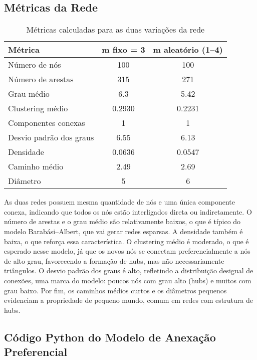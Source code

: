 \documentclass{article}
\begin{document}
\subsection*{Métricas da Rede}

\begin{table}[h]
\centering
\begin{tabular}{|l|c|c|}
\hline
\textbf{Métrica} & \textbf{m fixo = 3} & \textbf{m aleatório (1–4)} \\
\hline
Número de nós & 100 & 100 \\
Número de arestas & 315 & 271 \\
Grau médio & 6.3 & 5.42 \\
Clustering médio & 0.2930 & 0.2231 \\
Componentes conexas & 1 & 1 \\
Desvio padrão dos graus & 6.55 & 6.13 \\
Densidade & 0.0636 & 0.0547 \\
Caminho médio & 2.49 & 2.69 \\
Diâmetro & 5 & 6 \\
\hline
\end{tabular}
\caption{Métricas calculadas para as duas variações da rede}
\label{tab:metricas_rede}
\end{table}

As duas redes possuem mesma quantidade de nós e uma única componente conexa, indicando que todos os nós estão interligados direta ou indiretamente. O número de arestas e o grau médio são relativamente baixos, o que é típico do modelo Barabási–Albert, que vai gerar redes esparsas. A densidade também é baixa, o que reforça essa característica. O clustering médio é moderado, o que é esperado nesse modelo, já que os novos nós se conectam preferencialmente a nós de alto grau, favorecendo a formação de hubs, mas não necessariamente triângulos. O desvio padrão dos graus é alto, refletindo a distribuição desigual de conexões, uma marca do modelo: poucos nós com grau alto (hubs) e muitos com grau baixo. Por fim, os caminhos médios curtos e os diâmetros pequenos evidenciam a propriedade de pequeno mundo, comum em redes com estrutura de hubs.

\newpage

\subsection{Código Python do Modelo de Anexação Preferencial}
\end{document}
